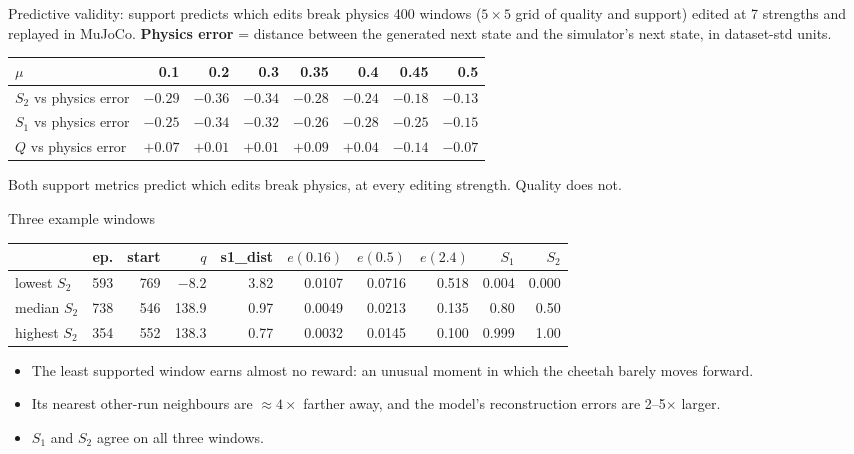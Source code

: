 \documentclass[aspectratio=169,11pt]{beamer}
\begin{document}
\begin{frame}{Predictive validity: support predicts which edits break physics}
400 windows ($5\times5$ grid of quality and support) edited at 7 strengths and replayed in MuJoCo. \textbf{Physics error} = distance between the generated next state and the simulator's next state, in dataset-std units.
\vspace{0.5em}

\centering
\begin{tabular}{lrrrrrrr}
\toprule
$\mu$ & 0.1 & 0.2 & 0.3 & 0.35 & 0.4 & 0.45 & 0.5\\
\midrule
$S_2$ vs physics error & $-0.29$ & $-0.36$ & $-0.34$ & $-0.28$ & $-0.24$ & $-0.18$ & $-0.13$\\
$S_1$ vs physics error & $-0.25$ & $-0.34$ & $-0.32$ & $-0.26$ & $-0.28$ & $-0.25$ & $-0.15$\\
$Q$ vs physics error & $+0.07$ & $+0.01$ & $+0.01$ & $+0.09$ & $+0.04$ & $-0.14$ & $-0.07$\\
\bottomrule
\end{tabular}
\vspace{0.5em}

\raggedright Both support metrics predict which edits break physics, at every editing strength. Quality does not.
\end{frame}

\begin{frame}{Three example windows}
\centering\small
\begin{tabular}{@{}lrrrrrrrrr@{}}
\toprule
 & ep. & start & $q$ & s1\_dist & $e(0.16)$ & $e(0.5)$ & $e(2.4)$ & $S_1$ & $S_2$\\
\midrule
lowest $S_2$ & 593 & 769 & $-8.2$ & 3.82 & 0.0107 & 0.0716 & 0.518 & 0.004 & 0.000\\
median $S_2$ & 738 & 546 & 138.9 & 0.97 & 0.0049 & 0.0213 & 0.135 & 0.80 & 0.50\\
highest $S_2$ & 354 & 552 & 138.3 & 0.77 & 0.0032 & 0.0145 & 0.100 & 0.999 & 1.00\\
\bottomrule
\end{tabular}
\vspace{0.8em}

\raggedright
\begin{itemize}
\item The least supported window earns almost no reward: an unusual moment in which the cheetah barely moves forward.
\item Its nearest other-run neighbours are $\approx4\times$ farther away, and the model's reconstruction errors are 2--5$\times$ larger.
\item $S_1$ and $S_2$ agree on all three windows.
\end{itemize}
\end{frame}
\end{document}
